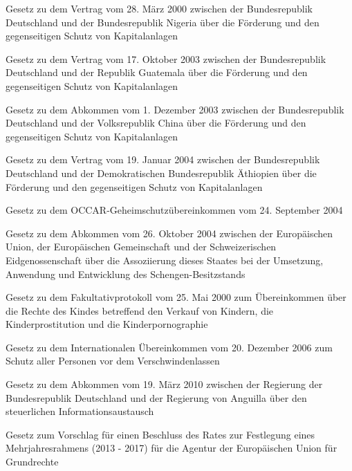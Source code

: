 \item[{GII050716}] Gesetz zu dem Vertrag vom 28. März 2000 zwischen der Bundesrepublik Deutschland und der Bundesrepublik Nigeria über die Förderung und den gegenseitigen Schutz von Kapitalanlagen

\item[{GII050725}] Gesetz zu dem Vertrag vom 17. Oktober 2003 zwischen der Bundesrepublik Deutschland und der Republik Guatemala über die Förderung und den gegenseitigen Schutz von Kapitalanlagen

\item[{GII050732}] Gesetz zu dem Abkommen vom 1. Dezember 2003 zwischen der Bundesrepublik Deutschland und der Volksrepublik China über die Förderung und den gegenseitigen Schutz von Kapitalanlagen

\item[{GII050743}] Gesetz zu dem Vertrag vom 19. Januar 2004 zwischen der Bundesrepublik Deutschland und der Demokratischen Bundesrepublik Äthiopien über die Förderung und den gegenseitigen Schutz von Kapitalanlagen

\item[{GII050778}] Gesetz zu dem OCCAR-Geheimschutzübereinkommen vom 24. September 2004

\item[{GII061362}] Gesetz zu dem Abkommen vom 26. Oktober 2004 zwischen der Europäischen Union, der Europäischen Gemeinschaft und der Schweizerischen Eidgenossenschaft über die Assoziierung dieses Staates bei der Umsetzung, Anwendung und Entwicklung des Schengen-Besitzstands

\item[{GII081222}] Gesetz zu dem Fakultativprotokoll vom 25. Mai 2000 zum Übereinkommen über die Rechte des Kindes betreffend den Verkauf von Kindern, die Kinderprostitution und die Kinderpornographie

\item[{GII090932}] Gesetz zu dem Internationalen Übereinkommen vom 20. Dezember 2006 zum Schutz aller Personen vor dem Verschwindenlassen

\item[{GII101381}] Gesetz zu dem Abkommen vom 19. März 2010 zwischen der Regierung der Bundesrepublik Deutschland und der Regierung von Anguilla über den steuerlichen Informationsaustausch

\item[{GII121378}] Gesetz zum Vorschlag für einen Beschluss des Rates zur Festlegung eines Mehrjahresrahmens (2013 - 2017) für die Agentur der Europäischen Union für Grundrechte

